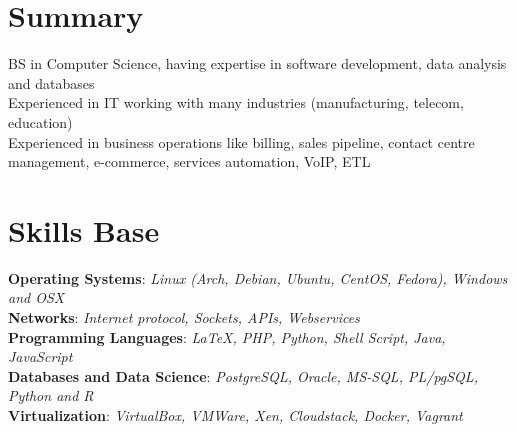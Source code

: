 \documentclass[margin]{res}
\begin{document}
\fontsize{9}{12}
\selectfont
\address{\textbf{ANDRE LEITE REIS} \\
         London, UK \\
         andre.reis@gmail.com \\
         +44 074 8210 1626 \\
         reis.github.io \\
         github.com/reis \\
         linkedin.com/in/andreleitereis }

\begin{resume}
\section{Summary}
    BS in Computer Science, having expertise in software development, data analysis and databases \\
    Experienced in IT working with many industries (manufacturing, telecom, education) \\
    Experienced in business operations like billing, sales pipeline, contact centre management, e-commerce, services automation, VoIP, ETL \\

\section{Skills Base}
    \textbf{Operating Systems}: \textit{Linux (Arch, Debian, Ubuntu, CentOS, Fedora), Windows and OSX} \\
    \textbf{Networks}: \textit{Internet protocol, Sockets, APIs, Webservices} \\
    \textbf{Programming Languages}: \textit{\LaTeX, PHP, Python, Shell Script, Java, JavaScript} \\
    \textbf{Databases and Data Science}: \textit{PostgreSQL, Oracle, MS-SQL, PL/pgSQL, Python and R} \\
    \textbf{Virtualization}: \textit{VirtualBox, VMWare, Xen, Cloudstack, Docker, Vagrant} \\


\end{resume}
\end{document}
